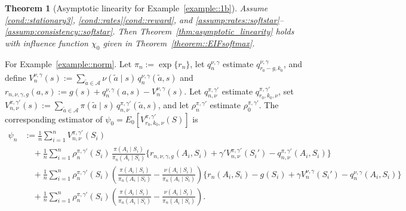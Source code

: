 \documentclass[12pt]{article}
\theoremstyle{plain}
\newtheorem{theorem}{Theorem}
\begin{document}
 
 


\begin{theorem}[Asymptotic linearity for Example~\ref{example::1b}]
\label{theorem::ALex1b}
Assume \ref{cond::stationary3}, 
\ref{cond::rates}\ref{cond::reward}, and 
\ref{assump:rates::softstar}--\ref{assump:consistency::softstar}.  
Then Theorem~\ref{thm:asymptotic_linearity} holds with influence function 
$\chi_0$ given in Theorem~\ref{theorem::EIFsoftmax}.
\end{theorem}




 

 

 

For Example~\ref{example::norm}. Let \(\pi_n:=\exp\{r_n\}\), let
\(q_n^{\nu,\gamma}\) estimate \(q_{r_0-g,k_0}^{\nu,\gamma}\), and define
\(V_n^{\nu,\gamma}(s):=\sum_{\tilde a\in\mathcal A}\nu(\tilde a\mid s)\,
q_n^{\nu,\gamma}(\tilde a,s)\) and
\(r_{n,\nu,\gamma,g}(a,s):=g(s)+q_n^{\nu,\gamma}(a,s)-V_n^{\nu,\gamma}(s)\).
Let \(q_{n,\nu}^{\pi,\gamma'}\) estimate
\(q_{r_0,k_0,\nu}^{\pi,\gamma'}\), set
\(V_{n,\nu}^{\pi,\gamma'}(s):=\sum_{\tilde a\in\mathcal A}\pi(\tilde a\mid s)\,
q_{n,\nu}^{\pi,\gamma'}(\tilde a,s)\), and let \(\rho_n^{\pi,\gamma'}\)
estimate \(\rho_0^{\pi,\gamma'}\). The corresponding estimator of
\(\psi_0=E_0[V_{r_0,k_0,\nu}^{\pi,\gamma'}(S)]\) is
\begin{align*}
\psi_n
&:= \frac{1}{n}\sum_{i=1}^n V_{n,\nu}^{\pi,\gamma'}(S_i) \\
&\quad + \frac{1}{n}\sum_{i=1}^n \rho_n^{\pi,\gamma'}(S_i)\,
        \frac{\pi(A_i \mid S_i)}{\pi_n(A_i \mid S_i)}
        \bigl\{r_{n,\nu,\gamma,g}(A_i,S_i)
        + \gamma' V_{n,\nu}^{\pi,\gamma'}(S_i')
        - q_{n,\nu}^{\pi,\gamma'}(A_i,S_i)\bigr\} \\
&\quad + \frac{1}{n}\sum_{i=1}^n \rho_n^{\pi,\gamma'}(S_i)
        \left(
            \frac{\pi(A_i \mid S_i)}{\pi_n(A_i \mid S_i)}
            -
            \frac{\nu(A_i \mid S_i)}{\pi_n(A_i \mid S_i)}
        \right)
        \bigl\{r_n(A_i,S_i) - g(S_i)
        + \gamma V_n^{\nu,\gamma}(S_i')
        - q_n^{\nu,\gamma}(A_i,S_i)\bigr\} \\
&\quad + \frac{1}{n}\sum_{i=1}^n \rho_n^{\pi,\gamma'}(S_i)
        \left(
            \frac{\pi(A_i \mid S_i)}{\pi_n(A_i \mid S_i)}
            -
            \frac{\nu(A_i \mid S_i)}{\pi_n(A_i \mid S_i)}
        \right).
\end{align*}
 
\end{document}
